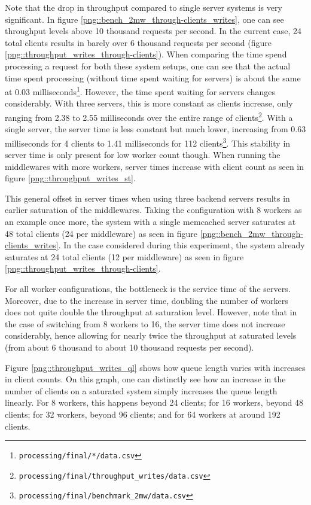 \documentclass[11pt,a4paper]{article}
\begin{document}
Note that the drop in throughput compared to single server systems is very significant. In figure \ref{png::bench_2mw_through-clients_writes}, one can see throughput levels above 10 thousand requests per second. In the current case, 24 total clients results in barely over 6 thousand requests per second (figure \ref{png::throughput_writes_through-clients}). When comparing the time spend processing a request for both these system setups, one can see that the actual time spent processing (without time spent waiting for servers) is about the same at 0.03 milliseconds\footnote{\texttt{processing/final/*/data.csv}}. However, the time spent waiting for servers changes considerably. With three servers, this is more constant as clients increase, only ranging from 2.38 to 2.55 milliseconds over the entire range of clients\footnote{\texttt{processing/final/throughput_writes/data.csv}}. With a single server, the server time is less constant but much lower, increasing from 0.63 milliseconds for 4 clients to 1.41 milliseconds for 112 clients\footnote{\texttt{processing/final/benchmark_2mw/data.csv}}. This stability in server time is only present for low worker count though. When running the middlewares with more workers, server times increase with client count as seen in figure \ref{png::throughput_writes_st}.

This general offset in server times when using three backend servers results in earlier saturation of the middlewares. Taking the configuration with 8 workers as an example once more, the system with a single memcached server saturates at 48 total clients (24 per middleware) as seen in figure \ref{png::bench_2mw_through-clients_writes}. In the case considered during this experiment, the system already saturates at 24 total clients (12 per middleware) as seen in figure \ref{png::throughput_writes_through-clients}.

For all worker configurations, the bottleneck is the service time of the servers. Moreover, due to the increase in server time, doubling the number of workers does not quite double the throughput at saturation level. However, note that in the case of switching from 8 workers to 16, the server time does not increase considerably, hence allowing for nearly twice the throughput at saturated levels (from about 6 thousand to about 10 thousand requests per second).

Figure \ref{png::throughput_writes_ql} shows how queue length varies with increases in client counts. On this graph, one can distinctly see how an increase in the number of clients on a saturated system simply increases the queue length linearly. For 8 workers, this happens beyond 24 clients; for 16 workers, beyond 48 clients; for 32 workers, beyond 96 clients; and for 64 workers at around 192 clients.
\end{document}
